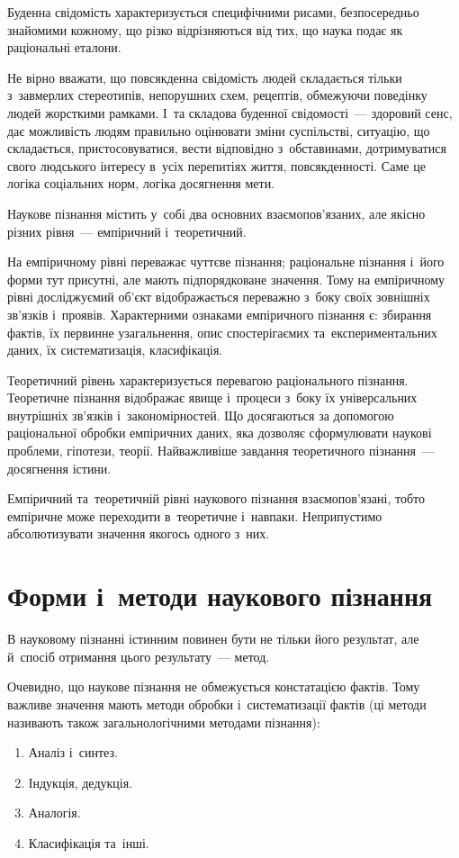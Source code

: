 \documentclass[a5paper,oneside,DIV=12,12pt,headings=small]{scrartcl}
\begin{document}
		Буденна свідомість характеризується специфічними рисами, безпосередньо знайомими кожному, що різко відрізняються від тих, що наука подає як раціональні еталони.

		Не вірно вважати, що повсякденна свідомість людей складається тільки  з~завмерлих стереотипів, непорушних схем, рецептів, обмежуючи поведінку  людей жорсткими рамками. І~та складова буденної свідомості~— здоровий  сенс, дає можливість людям правильно оцінювати зміни суспільстві, ситуацію, що складається, пристосовуватися, вести відповідно з~обставинами, дотримуватися свого людського інтересу в~усіх перепитіях життя, повсякденності. Саме це логіка соціальних норм, логіка досягнення мети.
		
		Наукове пізнання містить у~собі два основних взаємопов'язаних, але якісно різних рівня~— емпіричний і~теоретичний.
		
		На емпіричному рівні переважає чуттєве пізнання; раціональне пізнання і~його форми тут присутні, але мають підпорядковане значення. Тому на емпіричному рівні досліджуємий об'\-єкт відображається переважно з~боку своїх зовнішніх зв'язків і~проявів. Характерними ознаками емпіричного пізнання є: збирання фактів, їх первинне узагальнення, опис спостерігаємих та~експериментальних даних, їх систематизація, класифікація.
		
		Теоретичний рівень характеризується перевагою раціонального пізнання. Теоретичне пізнання відображає явище і~процеси з~боку їх універсальних внутрішніх зв'язків і~закономірностей. Що досягаються за допомогою раціональної обробки емпіричних даних, яка дозволяє сформулювати наукові проблеми, гіпотези, теорії. Найважливіше завдання теоретичного пізнання~— досягнення істини.
		
		Емпіричний та~теоретичній рівні наукового пізнання вза\-є\-мо\-пов'\-я\-за\-ні, тобто емпіричне може переходити в~теоретичне і~навпаки. Неприпустимо абсолютизувати значення якогось одного з~них.

	\section{Форми і~методи наукового пізнання}
		В науковому пізнанні істинним повинен бути не тільки його результат, але й~спосіб отримання цього результату~— метод. 

		Очевидно, що наукове пізнання не обмежується констатацією фактів. Тому важливе значення мають методи обробки і~систематизації фактів (ці методи називають також загальнологічними методами пізнання):
		\begin{enumerate}
			\item Аналіз і~синтез.
			\item Індукція, дедукція.
			\item Аналогія.
			\item Класифікація та~інші.
		\end{enumerate}
		
\end{document}
